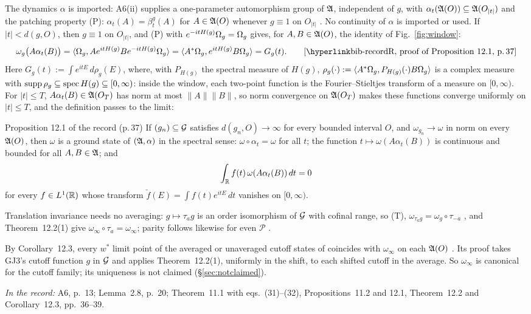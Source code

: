 The dynamics $\alpha$ is imported: A6(ii) supplies a one-parameter automorphism group of
$\mathfrak{A}$, independent of $g$, with $\alpha_t(\mathfrak{A}(O))\subseteq\mathfrak{A}(O_{|t|})$ and the patching
property (P): $\alpha_t(A)=\beta^g_t(A)$ for $A\in\mathfrak{A}(O)$ whenever $g\equiv1$ on
$O_{|t|}$ . No continuity of $\alpha$ is imported or used. If $|t|<d(g,O)$,
then $g\equiv1$ on $O_{|t|}$, and (P) with $e^{-itH(g)}\Omega_g=\Omega_g$ gives, for
$A,B\in\mathfrak{A}(O)$, the identity of Fig.~\ref{fig:window}:
\begin{equation*}
  \omega_g\bigl(A\alpha_t(B)\bigr)
  =\ip{\Om_g}{Ae^{itH(g)}Be^{-itH(g)}\Om_g}
  =\ip{A^*\Om_g}{e^{itH(g)}B\Om_g}=G_g(t) .
  \tag*{\rec{proof of Proposition~12.1}{37}}
\end{equation*}
Here $G_g(t):=\int e^{itE}\,d\rho_g(E)$, where, with $P_{H(g)}$ the spectral measure of
$H(g)$, $\rho_g(\cdot):=\langle A^*\Omega_g,P_{H(g)}(\cdot)B\Omega_g\rangle$ is a complex measure with
$\operatorname{supp}\rho_g\subseteq\operatorname{spec} H(g)\subseteq[0,\infty)$: inside the window, each two-point
function is the Fourier--Stieltjes transform of a measure on $[0,\infty)$. For
$|t|\le T$, $A\alpha_t(B)\in\mathfrak{A}(O_T)$ has norm at most $\|A\|\|B\|$, so norm convergence
on $\mathfrak{A}(O_T)$ makes these functions converge uniformly on $|t|\le T$, and the definition
passes to the limit:
\begin{recordbox}{Proposition 12.1 of the record (p.\,37)}
If $(g_n)\subseteq\mathcal{G}$ satisfies $d(g_n,O)\to\infty$ for every bounded interval $O$, and
$\omega_{g_n}\to\omega$ in norm on every $\mathfrak{A}(O)$, then $\omega$ is a ground state of
$(\mathfrak{A},\alpha)$ in the spectral sense: $\omega\circ\alpha_t=\omega$ for all $t$; the
function $t\mapsto\omega(A\alpha_t(B))$ is continuous and bounded for all $A,B\in\mathfrak{A}$; and
\[
 \int_{\mathbb{R}} f(t)\,\omega(A\alpha_t(B))\,dt=0
\]
for every $f\in L^1(\mathbb{R})$ whose transform $\check f(E)=\int f(t)e^{itE}\,dt$ vanishes on
$[0,\infty)$.
\end{recordbox}

Translation invariance needs no averaging: $g\mapsto\tau_ag$ is an order isomorphism of
$\mathcal{G}$ with cofinal range, so (T), $\omega_{\tau_ag}=\omega_g\circ\tau_{-a}$
, and Theorem~12.2(1) give $\omega_\infty\circ\tau_a=\omega_\infty$;
parity follows likewise for even $\mathscr P$ .

By Corollary~12.3, every $w^*$ limit point of the averaged or unaveraged cutoff states of
\cite[\S2]{GJ3} coincides with $\omega_\infty$ on each $\mathfrak{A}(O)$ .
Its proof takes GJ3's cutoff function $g$ in $\mathcal{G}$ and applies Theorem~12.2(1), uniformly
in the shift, to each shifted cutoff in the average. So $\omega_\infty$ is canonical for
the cutoff family; its uniqueness is not claimed (\S\ref{sec:notclaimed}).

\noindent\emph{In the record:} A6, p.~13; Lemma~2.8, p.~20; Theorem~11.1 with
eqs.~(31)--(32), Propositions~11.2 and 12.1, Theorem~12.2 and Corollary~12.3, pp.~36--39.
